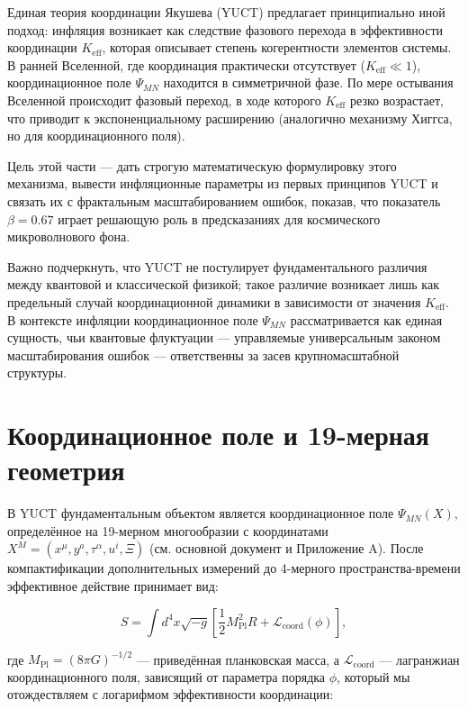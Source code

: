 \documentclass[11pt,a4paper]{article}
\newcommand{\Keff}{K_{\mathrm{eff}}}
\newcommand{\Mpl}{M_{\mathrm{Pl}}}
\begin{document}
	Единая теория координации Якушева (YUCT) предлагает принципиально иной подход: инфляция возникает как следствие фазового перехода в эффективности координации \(\Keff\), которая описывает степень когерентности элементов системы. В ранней Вселенной, где координация практически отсутствует (\(\Keff \ll 1\)), координационное поле \(\Psi_{MN}\) находится в симметричной фазе. По мере остывания Вселенной происходит фазовый переход, в ходе которого \(\Keff\) резко возрастает, что приводит к экспоненциальному расширению (аналогично механизму Хиггса, но для координационного поля).
	
	Цель этой части — дать строгую математическую формулировку этого механизма, вывести инфляционные параметры из первых принципов YUCT и связать их с фрактальным масштабированием ошибок, показав, что показатель \(\beta = 0.67\) играет решающую роль в предсказаниях для космического микроволнового фона.
	
	Важно подчеркнуть, что YUCT не постулирует фундаментального различия между квантовой и классической физикой; такое различие возникает лишь как предельный случай координационной динамики в зависимости от значения \(K_{\mathrm{eff}}\). В контексте инфляции координационное поле \(\Psi_{MN}\) рассматривается как единая сущность, чьи квантовые флуктуации — управляемые универсальным законом масштабирования ошибок — ответственны за засев крупномасштабной структуры.
	
	\section{Координационное поле и 19-мерная геометрия}
	\label{sec:field}
	
	В YUCT фундаментальным объектом является координационное поле \(\Psi_{MN}(X)\), определённое на 19-мерном многообразии с координатами \(X^M = (x^\mu, y^a, \tau^\alpha, u^i, \Xi)\) (см. основной документ и Приложение A). После компактификации дополнительных измерений до 4-мерного пространства-времени эффективное действие принимает вид:
	
	\begin{equation}
		S = \int d^4x \sqrt{-g} \left[ \frac{1}{2} \Mpl^2 R + \mathcal{L}_{\mathrm{coord}}(\phi) \right],
		\label{eq:action}
	\end{equation}
	
	где \(\Mpl = (8\pi G)^{-1/2}\) — приведённая планковская масса, а \(\mathcal{L}_{\mathrm{coord}}\) — лагранжиан координационного поля, зависящий от параметра порядка \(\phi\), который мы отождествляем с логарифмом эффективности координации:
	
\end{document}
